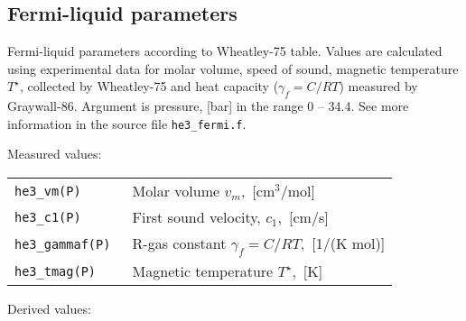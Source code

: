 \documentclass[a4paper]{article}
\begin{document}
\eject
\subsection*{Fermi-liquid parameters}

Fermi-liquid parameters according to {Wheatley-75} table. Values are
calculated using experimental data for molar volume, speed of sound,
magnetic temperature $T^\star$, collected by {Wheatley-75} and heat
capacity ($\gamma_f=C/RT$) measured by {Graywall-86}. Argument is
pressure, [bar] in the range 0 -- 34.4. See more information in the
source file {\tt he3\_fermi.f}.

\medskip
Measured values:

\medskip
\begin{tabular}{lp{9cm}}
\tt he3\_vm(P)     & Molar volume $v_m$,~[cm$^3$/mol]\\
\tt he3\_c1(P)     & First sound velocity, $c_1$,~[cm/s]\\
\tt he3\_gammaf(P) & R-gas constant $\gamma_f = C/RT$,~[1/(K mol)]\\
\tt he3\_tmag(P)   & Magnetic temperature $T^\star$,~[K]\newline\\
\end{tabular}

Derived values:
\end{document}
